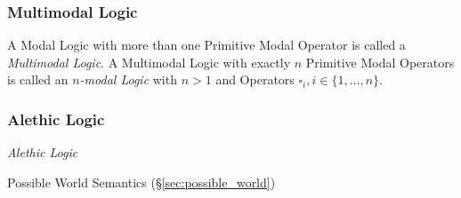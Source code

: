 \subsubsection{Multimodal Logic}\label{sec:multimodal_logic}

A Modal Logic with more than one Primitive Modal Operator is called a
\emph{Multimodal Logic}. A Multimodal Logic with exactly $n$ Primitive
Modal Operators is called an \emph{$n$-modal Logic} with $n > 1$ and
Operators $\square_i, i \in \{1, \ldots, n\}$.



\subsubsection{Alethic Logic}\label{sec:alethic_logic}

\emph{Alethic Logic}

Possible World Semantics (\S\ref{sec:possible_world})

